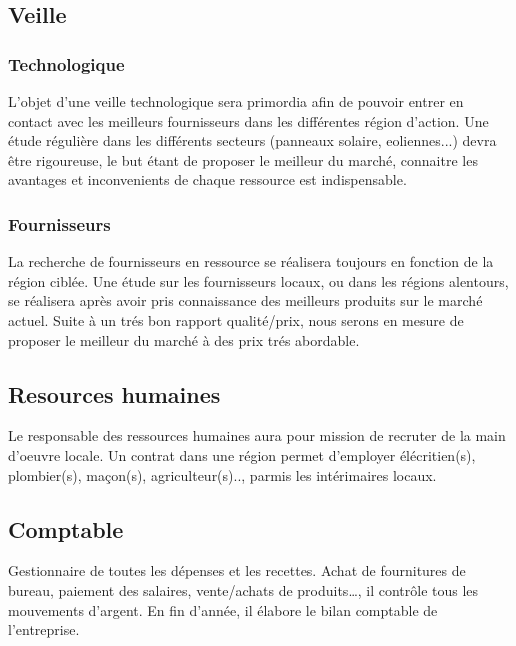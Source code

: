 \documentclass[10pt]{article}
\begin{document}
\subsection{Veille}
\label{sec:}
\subsubsection{Technologique}
\label{ssub:}
L'objet d'une veille technologique sera primordia afin de pouvoir entrer en contact avec les meilleurs fournisseurs dans les différentes région d'action. Une étude régulière dans les différents secteurs (panneaux solaire, eoliennes...) devra être rigoureuse, le but étant de proposer le meilleur du marché, connaitre les avantages et inconvenients de chaque ressource est indispensable.


\subsubsection{Fournisseurs}
\label{ssub:}
La recherche de fournisseurs en ressource se réalisera toujours en fonction de la région ciblée. Une étude sur les fournisseurs locaux, ou dans les régions alentours, se réalisera après avoir pris connaissance des meilleurs produits sur le marché actuel. Suite à un trés bon rapport qualité/prix, nous serons en mesure de proposer le meilleur du marché à des prix trés abordable.


\subsection{Resources humaines}
\label{sec:rh}
Le responsable des ressources humaines aura pour mission de recruter de la main d'oeuvre locale. Un contrat dans une région permet d'employer élécritien(s), plombier(s), maçon(s), agriculteur(s).., parmis les intérimaires locaux.

\subsection{Comptable}
\label{sec:}
Gestionnaire de toutes les dépenses et les recettes. Achat de fournitures de bureau, paiement des salaires, vente/achats de produits…, il contrôle tous les mouvements d’argent. En fin d’année, il élabore le bilan comptable de l’entreprise. 
\end{document}
